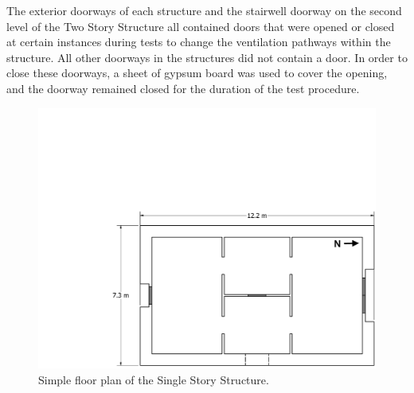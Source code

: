 \documentclass[12pt,oneside]{book}
\begin{document}
The exterior doorways of each structure and the stairwell doorway on the second level of the Two Story Structure all contained doors that were opened or closed at certain instances during tests to change the ventilation pathways within the structure. All other doorways in the structures did not contain a door. In order to close these doorways, a sheet of gypsum board was used to cover the opening, and the doorway remained closed for the duration of the test procedure.

\begin{figure}[!ht]
	\includegraphics[width=\columnwidth]{../Figures/Floor_Plans/East_Test_Structure_Dimensioned_LxW}
	\caption[Simple floor plan of the Single Story Structure.]{Simple floor plan of the Single Story Structure.}
	\label{fig:simple_east_dimensioned_plan}
\end{figure}
\end{document}
